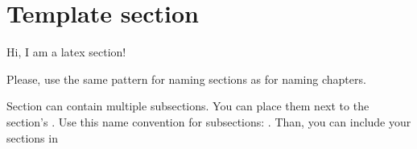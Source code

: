 \section{Template section}
\label{sec:template-section}


Hi, I am a latex section!

Please, use the same pattern for naming sections as for naming chapters.

Section can contain multiple subsections. You can place them next to the
section's . Use this name convention for subsections:
. Than, you can include your
sections in 


